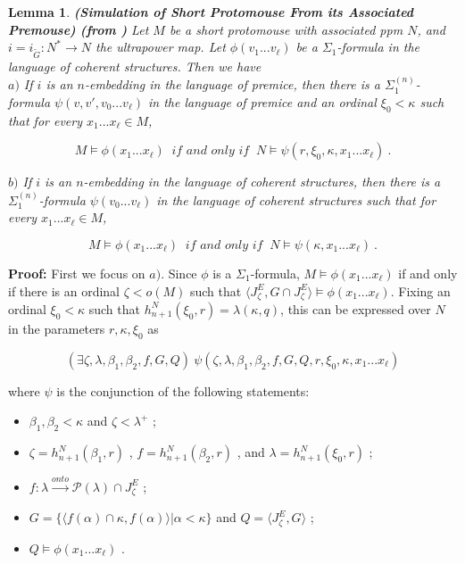 \documentclass[12pt]{article}
\newtheorem{lem}[thm]{Lemma}
\begin{document}
\begin{lem} \label{translation3}
\textbf{(Simulation of Short Protomouse From its Associated Premouse)}
\textbf{(from \cite{zeman square proof})}
Let $M$ be a short protomouse with associated ppm $N$, and $i = i_{\tilde{G}}: N^* \longrightarrow N$ the ultrapower map.  Let $\phi ( v_1 ... v_\ell )$ be a $\Sigma_1$-formula in the language of coherent structures.  Then we have\\

\indent \indent $a)$ If $i$ is an $n$-embedding in the language of premice, then there is a $\Sigma_1^{(n)}$-formula $\psi ( v, v' , v_0 ... v_\ell )$ in the language of premice and an ordinal $\xi_0 < \kappa$ such that for every $x_1 ... x_\ell \in M$, 

\[
M \models \phi ( x_1 ... x_\ell ) \ \textit{ if and only if } \ N \models \psi ( r , \xi_0 , \kappa , x_1 ... x_\ell ) \ .
\]

\indent \indent $b)$ If $i$ is an $n$-embedding in the language of coherent structures, then there is a $\Sigma_1^{(n)}$-formula $\psi ( v_0 ... v_\ell )$ in the language of coherent structures such that for every $x_1 ... x_\ell \in M$,

\[
M \models \phi ( x_1 ... x_\ell ) \ \textit{ if and only if } \ N \models \psi ( \kappa , x_1 ... x_\ell ) \ .
\]

\end{lem}

\indent \indent \textbf{Proof:}  First we focus on $a)$.  Since $\phi$ is a $\Sigma_1$-formula, $M \models \phi (x_1 ... x_\ell)$ if and only if there is an ordinal $\zeta < o(M)$ such that $ \langle J^E_\zeta , G \cap J^E_\zeta \rangle \models \phi (x_1 ... x_\ell )$.  Fixing an ordinal $\xi_0 < \kappa$ such that $h_{n+1}^N ( \xi_0 , r ) = \lambda (\kappa , q)$, this can be expressed over $N$ in the parameters $r , \kappa , \xi_0$ as

\[
( \exists \zeta , \lambda , \beta_1 , \beta_2 , f , G , Q ) \ \psi ( \zeta , \lambda , \beta_1 , \beta_2 , f , G , Q , r , \xi_0 , \kappa , x_1 ... x_\ell )
\]

where $\psi$ is the conjunction of the following statements:\\

\begin{itemize}

\item{$\beta_1 , \beta_2 < \kappa$ and $\zeta < \lambda^+$ ;}
\item{$\zeta = h_{n+1}^N ( \beta_1 , r )$ , $f = h_{n+1}^N ( \beta_2 , r )$ , and $\lambda = h_{n+1}^N ( \xi_0 , r )$ ;}
\item{$f : \lambda \xrightarrow{onto} \mathcal{P} (\lambda ) \cap J^E_\zeta$ ; }
\item{$G = \{ \langle f ( \alpha ) \cap \kappa , f (\alpha ) \rangle | \alpha < \kappa \}$ and $Q = \langle J^E_\zeta , G \rangle$ ;}
\item{$Q \models \phi (x_1 ... x_\ell )$ . }
 

\end{itemize}
\end{document}

